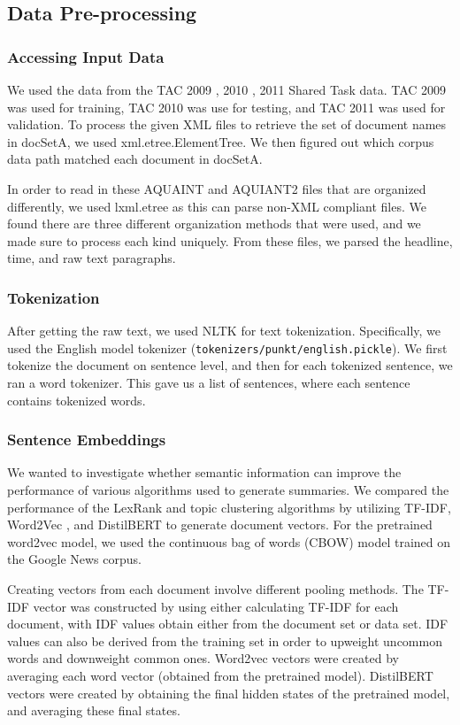\subsection{Data Pre-processing}

\subsubsection{Accessing Input Data}

We used the data from the TAC 2009 \cite{tac20009}, 2010 \cite{tac2010}, 2011 \cite{tac2011} Shared Task data. TAC 2009 was used for training, TAC 2010 was use for testing, and TAC 2011 was used for validation. To process the given XML files to retrieve the set of document names in docSetA, we used xml.etree.ElementTree. We then figured out which corpus data path matched each document in docSetA.

In order to read in these AQUAINT and AQUIANT2 files that are organized differently, we used lxml.etree as this can parse non-XML compliant files. We found there are three different organization methods that were used, and we made sure to process each kind uniquely. From these files, we parsed the headline, time, and raw text paragraphs.

\subsubsection{Tokenization}

 After getting the raw text, we used NLTK \cite{nltk} for text tokenization. Specifically, we used the English model tokenizer (\texttt{tokenizers/punkt/english.pickle}). We first tokenize the document on sentence level, and then for each tokenized sentence, we ran a word tokenizer. This gave us a list of sentences, where each sentence contains tokenized words. 

\subsubsection{Sentence Embeddings}\label{sentence_embeddings}
We wanted to investigate whether semantic information can improve the performance of various algorithms used to generate summaries. We compared the performance of the LexRank and topic clustering algorithms by utilizing TF-IDF, Word2Vec \cite{mikolov2013-word2vec}, and DistilBERT \cite{Sanh2019DistilBERTAD} to generate document vectors. For the pretrained word2vec model, we used the continuous bag of words (CBOW) model trained on the Google News corpus. 

Creating vectors from each document involve different pooling methods. The TF-IDF vector was constructed by using either calculating TF-IDF for each document, with IDF values obtain either from the document set or data set. IDF values can also be derived from the training set in order to upweight uncommon words and downweight common ones. Word2vec vectors were created by averaging each word vector (obtained from the pretrained model). DistilBERT vectors were created by obtaining the final hidden states of the pretrained model, and averaging these final states.